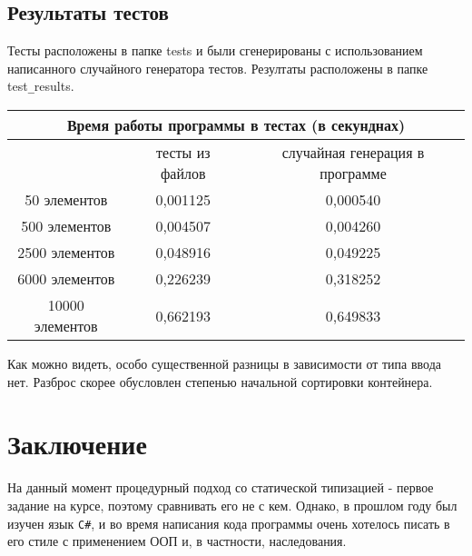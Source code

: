 \documentclass[a4paper]{article}
\begin{document}
\subsection*{Результаты тестов}
Тесты расположены в папке tests и были сгенерированы с использованием написанного случайного генератора тестов. Резултаты расположены в папке test\verb|_|results.

\begin{tabular}{ |c|c|c| }   
    \hline
    \multicolumn{3}{|c|}{Время работы программы в тестах (в секунднах)}\\
    \hline
    & тесты из файлов & случайная генерация в программе \\
    \hline
    50 элементов & 0,001125 & 0,000540\\
    \hline
    500 элементов & 0,004507 & 0,004260\\
    \hline
    2500 элементов & 0,048916 & 0,049225\\
    \hline
    6000 элементов & 0,226239 & 0,318252\\
    \hline
    10000 элементов & 0,662193 & 0,649833\\
    \hline
\end{tabular}
Как можно видеть, особо существенной разницы в зависимости от типа ввода нет. Разброс скорее обусловлен степенью начальной сортировки контейнера.
\section*{Заключение}
На данный момент процедурный подход со статической типизацией - первое задание на курсе, поэтому сравнивать его не с кем. Однако, в прошлом году был изучен язык \verb|C#|, и во время написания кода программы очень хотелось писать в его стиле с применением ООП и, в частности, наследования.
\end{document}
